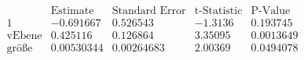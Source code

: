 \[\begin{array}{l|llll}
 \text{} & \text{Estimate} & \text{Standard Error} & \text{t-Statistic} & \text{P-Value} \\
\hline
 1 & -0.691667 & 0.526543 & -1.3136 & 0.193745 \\
 \text{vEbene} & 0.425116 & 0.126864 & 3.35095 & 0.0013649 \\
 \text{gr{\" o}{\ss}e} & 0.00530344 & 0.00264683 & 2.00369 & 0.0494078 \\
\end{array}\]

